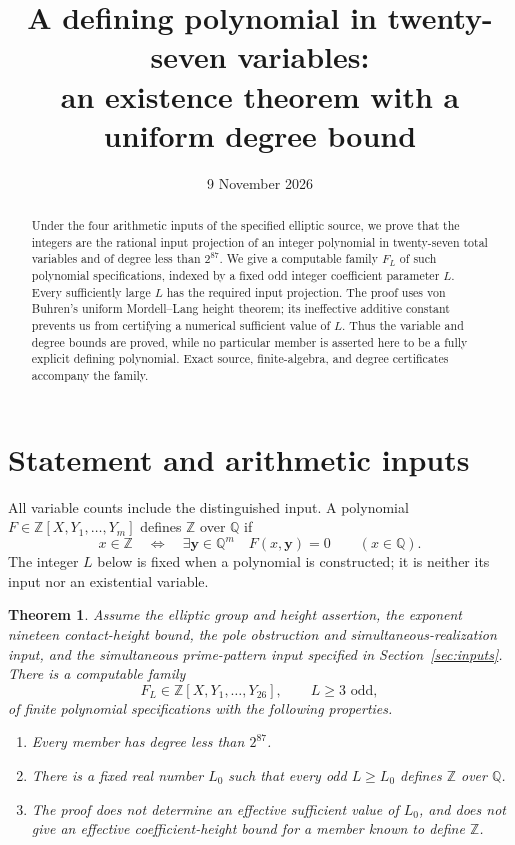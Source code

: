 \documentclass[11pt,a4paper]{article}
\title{A defining polynomial in twenty-seven variables:\\
an existence theorem with a uniform degree bound}
\author{}\date{9 November 2026}
\newtheorem{theorem}{Theorem}\newtheorem{lemma}[theorem]{Lemma}
\newcommand{\Q}{\mathbb Q}\newcommand{\Z}{\mathbb Z}
\begin{document}
\maketitle
\begin{abstract}
Under the four arithmetic inputs of the specified elliptic source,
we prove that the integers are the rational input projection of an
integer polynomial in twenty-seven total variables and of degree
less than $2^{87}$. We give a computable family $F_L$ of such
polynomial specifications, indexed by a fixed odd integer coefficient
parameter $L$. Every sufficiently large $L$ has the required input
projection. The proof uses von Buhren's uniform Mordell--Lang
height theorem; its ineffective additive constant prevents us from
certifying a numerical sufficient value of $L$. Thus the variable
and degree bounds are proved, while no particular member is asserted
here to be a fully explicit defining polynomial. Exact source,
finite-algebra, and degree certificates accompany the family.
\end{abstract}

\section{Statement and arithmetic inputs}

All variable counts include the distinguished input. A polynomial
$F\in\Z[X,Y_1,\ldots,Y_m]$ defines $\Z$ over $\Q$ if
\[
 x\in\Z\quad\Longleftrightarrow\quad
 \exists\mathbf y\in\Q^m\quad F(x,\mathbf y)=0
 \qquad(x\in\Q).
\]
The integer $L$ below is fixed when a polynomial is constructed;
it is neither its input nor an existential variable.

\begin{theorem}\label{thm:main}
Assume the elliptic group and height assertion, the exponent
nineteen contact-height bound, the pole obstruction and
simultaneous-realization input, and the simultaneous prime-pattern input
specified in Section~\ref{sec:inputs}. There is a computable
family
\[
 F_L\in\Z[X,Y_1,\ldots,Y_{26}],\qquad
 L\ge3\text{ odd},
\]
of finite polynomial specifications with the following properties.
\begin{enumerate}
\item Every member has degree less than $2^{87}$.
\item There is a fixed real number $L_0$ such that every odd
      $L\ge L_0$ defines $\Z$ over $\Q$.
\item The proof does not determine an effective sufficient
      value of $L_0$, and does not give an effective
      coefficient-height bound for a member known to define $\Z$.
\end{enumerate}
\end{theorem}
\end{document}
